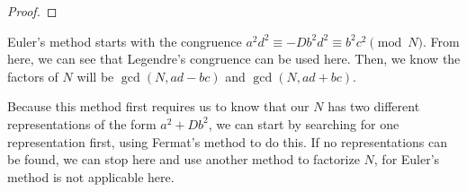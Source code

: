 \documentclass{article}
\begin{document}
\begin{proof}
\end{proof}

\par Euler's method starts with the congruence $a^2d^2 \equiv -Db^2d^2 \equiv b^2c^2 \pmod{N}$. From here, we can see that
Legendre's congruence can be used here. Then, we know the factors of $N$ will be $\gcd(N, ad-bc)$ and $\gcd(N,ad+bc)$.

\par Because this method first requires us to know that our $N$ has two different representations of the form $a^2+Db^2$,
we can start by searching for one representation first, using Fermat's method to do this. If no representations can
be found, we can stop here and use another method to factorize $N$, for Euler's method is not applicable here.
\end{document}
